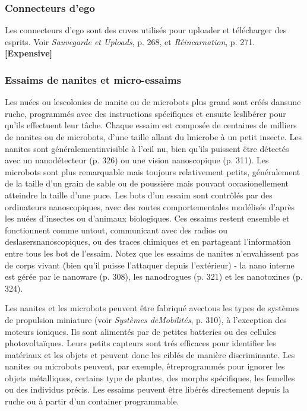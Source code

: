\subsubsection{Connecteurs d'ego} 

Les connecteurs d'ego sont des cuves utilisés pour uploader et télécharger des esprits. Voir \emph{Sauvegarde et Uploads}, p. 268, et \emph{Réincarnation}, p. 271. \textbf{[Expensive]} 

\subsubsection{Essaims de nanites et micro-essaims} 

Les nuées ou lescolonies de nanite ou de microbots plus grand sont créés dansune ruche, programmés avec des instructions spécifiques et ensuite leslibérer pour qu'ils effectuent leur tâche. Chaque essaim est composée de centaines de milliers de nanites ou de microbots, d'une taille allant du lmicrobe à un petit insecte. Les nanites sont généralementinvisible à l'œil nu, bien qu'ils puissent être détectés avec un nanodétecteur (p. 326) ou une vision nanoscopique (p. 311). Les microbots sont plus remarquable mais toujours relativement petits, généralement de la taille d'un grain de sable ou de poussière mais pouvant occasionellement atteindre la taille d'une puce. Les bots d'un essaim sont contrôlés par des ordinateurs nanoscopiques, avec des routes comportementales modélisés d'après les nuées d'insectes ou d'animaux biologiques. Ces essaims restent ensemble et fonctionnent comme untout, communicant avec des radios ou deslasersnanoscopiques, ou des traces chimiques et en partageant l'information entre tous les bot de l'essaim. Notez que les essaims de nanites n'envahissent pas de corps vivant (bien qu'il puisse l'attaquer depuis l'extérieur) - la nano interne est gérée par le nanoware (p. 308), les nanodrogues (p. 321) et les nanotoxines (p. 324). 

Les nanites et les microbots peuvent être fabriqué avectous les types de systèmes de propulsion miniature (voir \emph{Systèmes deMobilités}, p. 310), à l'exception des moteurs ioniques. Ils sont alimentés par de petites batteries ou des cellules photovoltaïques. Leurs petits capteurs sont trés efficaces pour identifier les matériaux et les objets et peuvent donc les ciblés de manière discriminante. Les nanites ou microbots peuvent, par exemple, êtreprogrammés pour ignorer les objets métalliques, certains type de plantes, des morphs spécifiques, les femelles ou des individus précis. Les essaims peuvent être libérés directement depuis la ruche ou à partir d'un container programmable. 

